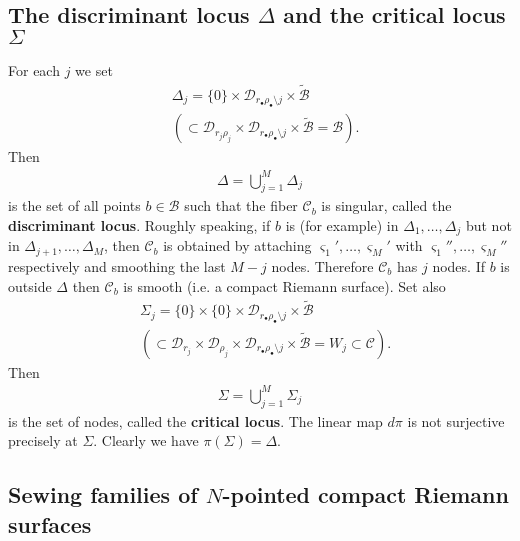 \documentclass[12pt,a4paper,notitlepage]{report}
\theoremstyle{definition}
\theoremstyle{plain}
\newcommand{\mc}{\mathcal}
\newcommand{\wtd}{\widetilde}
\newcommand{\sgm}{\varsigma}
\newcommand{\blt}{\bullet}
\numberwithin{equation}{section}
\begin{document}
\subsection*{The discriminant locus $\Delta$ and the critical locus $\Sigma$}


For each $j$ we set
\begin{align*}
&\Delta_j=\{0\}\times \mc D_{r_\blt\rho_\blt\setminus j}\times\wtd{\mc B}\\
& (\subset\mc D_{r_j\rho_j}\times\mc D_{r_\bullet\rho_\bullet\setminus j}\times\wtd{\mc B}=\mc B).
\end{align*}
Then 
\begin{align}
\Delta=\bigcup_{j=1}^M\Delta_j\label{eq132}
\end{align}
is the set of all points $b\in\mc B$ such that the fiber $\mc C_b$ is singular, called the \textbf{discriminant locus}. Roughly speaking, if $b$ is (for example) in $\Delta_1,\dots,\Delta_j$ but not in $\Delta_{j+1},\dots,\Delta_M$, then  $\mc C_b$ is obtained  by attaching $\sgm_1',\dots,\sgm_M'$ with $\sgm_1'',\dots,\sgm_M''$ respectively and smoothing the last $M-j$ nodes. Therefore $\mc C_b$ has $j$ nodes. If $b$ is outside $\Delta$ then $\mc C_b$ is smooth (i.e. a compact Riemann surface). Set also 
\begin{align*}
&\Sigma_j=\{0\}\times\{0\}\times\mc D_{r_\blt\rho_\blt\setminus j}\times\wtd{\mc B}\\
&(\subset\mc D_{r_j}\times\mc D_{\rho_j}\times\mc D_{r_\bullet\rho_\bullet\setminus j}\times\wtd{\mc B}=W_j\subset\mc C).
\end{align*}
Then 
\begin{align*}
\Sigma=\bigcup_{j=1}^M\Sigma_j
\end{align*}
is the set of nodes, called the \textbf{critical locus}. The linear map $d\pi$  is not surjective precisely at $\Sigma$. Clearly we have $\pi(\Sigma)=\Delta$.




\subsection*{Sewing families of $N$-pointed compact Riemann surfaces}
\end{document}
